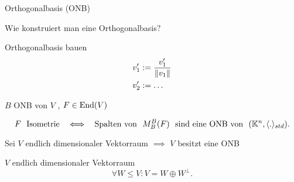 \documentclass[class=article, crop=false]{standalone}
\begin{document}
\begin{zettel}{Orthogonalbasis (ONB)}
\begin{flashcard}[]{}
	\begin{question}
		Wie konstruiert man eine Orthogonalbasis?
	\end{question}
	Orthogonalbasis bauen
	\begin{align*}
		v_1' & := \frac{v_1'}{ \left\|v_1\right\|} \\
		v_2' & := \dots
	\end{align*}

\end{flashcard}
$B$ ONB von $V$ , $F \in  \operatorname{End}(V)$
\begin{theorem}
	\[
		F \tx{ Isometrie } \iff  \tx{ Spalten von } M_B^B (F) \tx{ sind eine ONB von } (\mathbb{K}^n, \langle .\rangle_{std})
	.\]
\end{theorem}

\begin{corollary}
	Sei $V$ endlich dimensionaler Vektorraum $\implies $ $V$ besitzt eine ONB
\end{corollary}

\begin{corollary}
	$V$ endlich dimensionaler Vektorraum
	\[
		\forall W \leq  V : V = W \oplus W^{\perp}
	.\]
\end{corollary}

\end{zettel}
\end{document}
